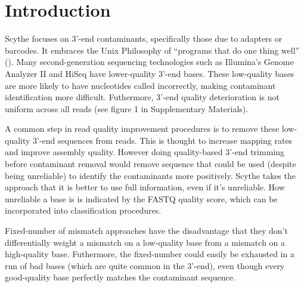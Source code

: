 \documentclass{bioinfo}
\begin{document}
\section{Introduction}
Scythe focuses on 3'-end contaminants, specifically those due to
adapters or barcodes. It embraces the Unix Philosophy of ``programs
that do one thing well'' (\citealp{raymond2003}). Many
second-generation sequencing technologies such as Illumina's Genome
Analyzer II and HiSeq have lower-quality 3'-end bases. These
low-quality bases are more likely to have nucleotides called
incorrectly, making contaminant identification more
difficult. Futhermore, 3'-end quality deterioration is not uniform
across all reads (see figure 1 in Supplementary Materials).

A common step in read quality improvement procedures is to remove
these low-quality 3'-end sequences from reads. This is thought to
increase mapping rates and improve assembly quality. However doing
quality-based 3'-end trimming before contaminant removal would remove
sequence that could be used (despite being unreliable) to identify the
contaminants more positively. Scythe takes the approach that it is
better to use full information, even if it's unreliable. How
unreliable a base is is indicated by the FASTQ quality score, which
can be incorporated into classification procedures.

Fixed-number of mismatch approaches have the disadvantage that they
don't differentially weight a mismatch on a low-quality base from a
mismatch on a high-quality base. Futhermore, the fixed-number could
easily be exhausted in a run of bad bases (which are quite common in
the 3'-end), even though every good-quality base perfectly matches the
contaminant sequence.
\end{document}
